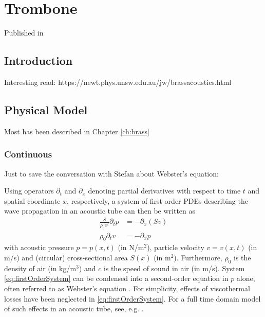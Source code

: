 \chapter{Trombone}\label{ch:trombone}
Published in \citeP[H]
\section{Introduction}
Interesting read: https://newt.phys.unsw.edu.au/jw/brassacoustics.html
\section{Physical Model}
Most has been described in Chapter \ref{ch:brass}

\subsection{Continuous}
Just to save the conversation with Stefan about Webster's equation:

Using operators $\partial_t$ and $\partial_x$ denoting partial derivatives with respect to time $t$ and spatial coordinate $x$, respectively, a system of first-order PDEs describing the wave propagation in an acoustic tube can then be written as
\begin{subequations}\label{eq:firstOrderSystem}
    \begin{align}
        \frac{S}{\rho_0 c^2}\partial_t p &= -\partial_x(Sv)\label{eq:contPressure}\\
        \rho_0\partial_tv &= -\partial_xp\label{eq:contVelocity}
    \end{align}
\end{subequations}
with acoustic pressure $p = p(x,t)$ (in N/m$^2$), particle velocity $v = v(x,t)$ (in m/s) and (circular) cross-sectional area $S(x)$ (in m$^2$). Furthermore, $\rho_0$ is the density of air (in kg/m$^3$) and $c$ is the speed of sound in air (in m/s). System \eqref{eq:firstOrderSystem} can be condensed into a second-order equation in $p$ alone, often referred to as Webster's equation \cite{Webster19}.    For simplicity, effects of viscothermal losses have been neglected in \eqref{eq:firstOrderSystem}. For a full time domain model of such effects in an acoustic tube, see, e.g. \cite{Bilbao2016}. 

